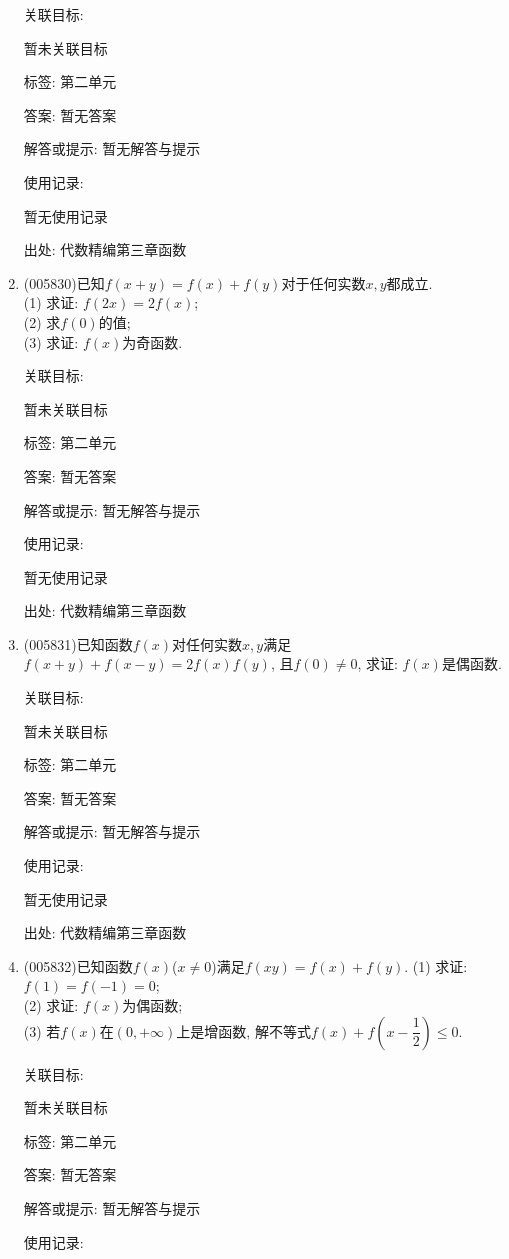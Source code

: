 \documentclass[10pt,a4paper]{article}
\begin{document}
\begin{enumerate}[1.]
关联目标:

暂未关联目标



标签: 第二单元

答案: 暂无答案

解答或提示: 暂无解答与提示

使用记录:

暂无使用记录


出处: 代数精编第三章函数
\item { (005830)}已知$f(x+y)=f(x)+f(y)$对于任何实数$x,y$都成立.\\
(1) 求证: $f(2x)=2f(x)$;\\
(2) 求$f(0)$的值;\\
(3) 求证: $f(x)$为奇函数.


关联目标:

暂未关联目标



标签: 第二单元

答案: 暂无答案

解答或提示: 暂无解答与提示

使用记录:

暂无使用记录


出处: 代数精编第三章函数
\item { (005831)}已知函数$f(x)$对任何实数$x,y$满足$f(x+y)+f(x-y)=2f(x)f(y)$, 且$f(0)\ne 0$, 求证: $f(x)$是偶函数.


关联目标:

暂未关联目标



标签: 第二单元

答案: 暂无答案

解答或提示: 暂无解答与提示

使用记录:

暂无使用记录


出处: 代数精编第三章函数
\item { (005832)}已知函数$f(x)$($x\ne 0$)满足$f(xy)=f(x)+f(y)$.
(1) 求证: $f(1)=f(-1)=0$;\\
(2) 求证: $f(x)$为偶函数;\\
(3) 若$f(x)$在$(0,+\infty)$上是增函数, 解不等式$f(x)+f(x-\dfrac 12)\le 0$.


关联目标:

暂未关联目标



标签: 第二单元

答案: 暂无答案

解答或提示: 暂无解答与提示

使用记录:


\end{enumerate}
\end{document}
